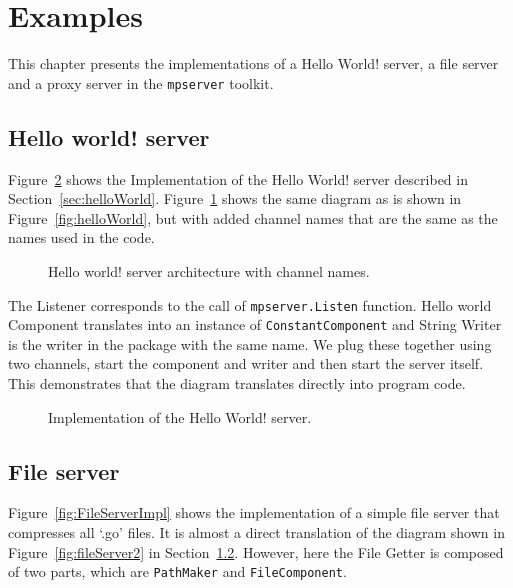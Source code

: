 \section{Examples}
\label{sec:examples}
This chapter presents the implementations of a Hello World! server,
a file server and a proxy server in the \texttt{mpserver} toolkit.

\subsection{Hello world! server}
Figure~\ref{fig:HelloWorldImpl} shows the Implementation of the Hello World!
server described in Section~\ref{sec:helloWorld}. Figure~\ref{fig:helloWorld2}
shows the same diagram as is shown in Figure~\ref{fig:helloWorld}, but with
added channel names that are the same as the names used in the code.

\begin{figure}[h]
\centering
{}
\caption[scale=1.0]{Hello world! server architecture with channel names.}
\label{fig:helloWorld2}
\end{figure}

The Listener corresponds to the call of \texttt{mpserver.Listen} function.
Hello world Component translates into an instance of \texttt{ConstantComponent}
and String Writer is the writer in the package with the same name.
We plug these together using two channels, start the component and writer 
and then start the server itself. This demonstrates that the diagram translates
directly into program code.

\begin{figure}[h]
\centering

\caption[scale=1.0]{Implementation of the Hello World! server.}
\label{fig:HelloWorldImpl}
\end{figure}

\newpage
\subsection{File server}
\label{sec:fileServer}
Figure~\ref{fig:FileServerImpl} shows the implementation of a simple 
file server that compresses all `.go' files. It is almost a direct translation
of the diagram shown in Figure~\ref{fig:fileServer2} in Section~\ref{sec:fileServer}.
However, here the File Getter is composed of two parts, which are \texttt{PathMaker}
and \texttt{FileComponent}.

